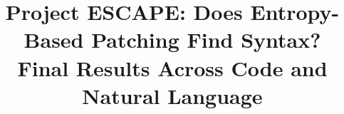 \usepackage{times}
\usepackage{latexsym}
\usepackage[T1]{fontenc}
\usepackage[utf8]{inputenc}
\usepackage{graphicx}
\usepackage{booktabs}
\usepackage{amsmath}
\usepackage{xcolor}
\setlength{\titlebox}{6cm}
\title{Project ESCAPE: Does Entropy-Based Patching Find Syntax?\\
Final Results Across Code and Natural Language}


